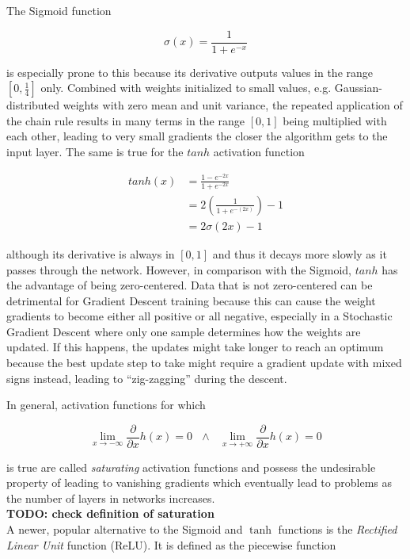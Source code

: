 The Sigmoid function

\[ \sigma(x) = \frac{1}{1 + e^{-x}} \]

\noindent is especially prone to this because its derivative outputs values in the range $\left [0, \frac{1}{4} \right ]$ only. Combined with weights initialized to small values, e.g. Gaussian-distributed weights with zero mean and unit variance, the repeated application of the chain rule results in many terms in the range $\left [0, 1\right ]$ being multiplied with each other, leading to very small gradients the closer the algorithm gets to the input layer. The same is true for the $tanh$ activation function

\begin {align}
	tanh(x) &= \frac{1 - e^{-2x}}{1 + e^{-2x}}\\
		  &= 2 \left ( \frac{1}{1 + e^{-(2x)}} \right ) - 1\\
		  &= 2 \sigma(2x) - 1
\end {align}

\noindent although its derivative is always in $[0, 1]$ and thus it decays more slowly as it passes through the network. However, in comparison with the Sigmoid, $tanh$ has the advantage of being zero-centered. Data that is not zero-centered can be detrimental for Gradient Descent training because this can cause the weight gradients to become either all positive or all negative, especially in a Stochastic Gradient Descent where only one sample determines how the weights are updated. If this happens, the updates might take longer to reach an optimum because the best update step to take might require a gradient update with mixed signs instead, leading to ``zig-zagging'' during the descent.

In general, activation functions for which

\[ \lim \limits_{x \rightarrow -\infty} \frac{\partial}{\partial x} h(x) = 0 \,\,\,\, \land \,\,\,\,  \lim \limits_{x \rightarrow +\infty} \frac{\partial}{\partial x} h(x) = 0 \]

\noindent is true are called \textit{saturating} activation functions and possess the undesirable property of leading to vanishing gradients which eventually lead to problems as the number of layers in networks increases.\\ 
 \textbf{TODO: check definition of saturation}\\

\noindent A newer, popular alternative to the Sigmoid and $\tanh$ functions is the \textit{Rectified Linear Unit} function (ReLU). It is defined as the piecewise function

